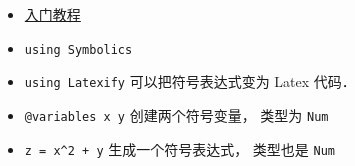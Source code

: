
\begin{itemize}
\item \href{https://symbolics.juliasymbolics.org/dev/tutorials/symbolic_functions/}{入门教程}
\item \verb|using Symbolics|
\item \verb|using Latexify| 可以把符号表达式变为 Latex 代码．
\item \verb|@variables x y| 创建两个符号变量， 类型为 \verb|Num|
\item \verb|z = x^2 + y| 生成一个符号表达式， 类型也是 \verb|Num|
\end{itemize}
